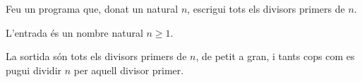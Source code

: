 

\Statement

Feu un programa que, donat un natural $n$, escrigui tots els divisors primers de $n$.

\Input

L'entrada és un nombre natural $n\ge1$.

\Output

La sortida són tots els divisors primers de $n$, de petit a gran, i tants cops com es pugui dividir $n$ per aquell divisor primer.

\Sample

